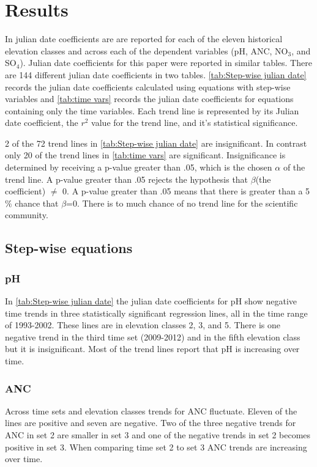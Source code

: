 \section{Results}
In \citet{robinson2008ph} julian date coefficients are are reported for each of the eleven historical elevation classes and across each of the dependent variables (pH, ANC, NO$_3$, and SO$_4$).  Julian date coefficients for this paper were reported in similar tables.  There are 144 different julian date coefficients in two tables.  \autoref{tab:Step-wise julian date} records the julian date coefficients calculated using equations with step-wise variables and \autoref{tab:time vars} records the julian date coefficients for  equations containing only the time variables.  Each trend line is represented by its Julian date coefficient, the $r^2$ value for the trend line, and it's statistical significance.

2 of the 72 trend lines in \autoref{tab:Step-wise julian date} are insignificant.  In contrast only 20 of the trend lines in \autoref{tab:time vars} are significant.   Insignificance is determined  by receiving a p-value greater than .05, which is the chosen $\alpha$ of the trend line.  A p-value greater than .05 rejects the hypothesis that $\beta$(the coefficient) $\neq$ 0.  A p-value greater than .05 means that there is greater than a 5$\%$ chance that $\beta$=0.  There is to much chance of no trend line for the scientific community.

\subsection{Step-wise equations}
\subsubsection{pH}
In \autoref{tab:Step-wise julian date} the julian date coefficients for pH show negative time trends in three statistically significant regression lines, all in the time range of 1993-2002.  These lines are in elevation classes 2, 3, and 5.  There is one negative trend in the third time set (2009-2012) and in the fifth elevation class but it is insignificant.   Most of the trend lines report that pH is increasing over time.

\subsubsection{ANC}
Across time sets and elevation classes trends for ANC fluctuate.  Eleven of the lines are positive and seven are negative.   Two of the three negative trends for ANC in set 2 are smaller in set 3 and one of the negative trends in set 2 becomes positive in set 3.  When comparing time set 2 to set 3 ANC trends are increasing over time. 

